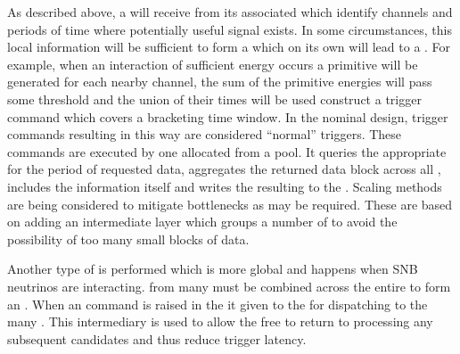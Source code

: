 As described above, a  will receive 
from its associated  which identify channels and periods
of time where potentially useful signal exists. 
In some circumstances, this local information will be sufficient to
form a  which on its own will lead to a
.
For example, when an interaction of sufficient energy occurs a
primitive will be generated for each nearby channel, the sum of the
primitive energies will pass some threshold and the union of their
times will be used construct a trigger command which covers a
bracketing time window. 
In the nominal design, trigger commands resulting in this way are
considered ``normal'' triggers. 
These commands are executed by one  allocated from a pool. 
It queries the appropriate  for the period of requested
data, aggregates the returned data block across all ,
includes the  information itself and writes the
resulting  to the .
Scaling methods are being considered to mitigate bottlenecks as may be
required.  
These are based on adding an intermediate layer which groups a number of
 to avoid the possibility of too many small blocks of
data.

Another type of  is performed which is more global
and happens when SNB neutrinos are interacting.
 from many  must be combined across
the entire  to form an 
.
When an  command is raised in the  it given to
the  for dispatching to the many .
This intermediary is used to allow the  free to return to
processing any subsequent candidates and thus reduce trigger latency.

